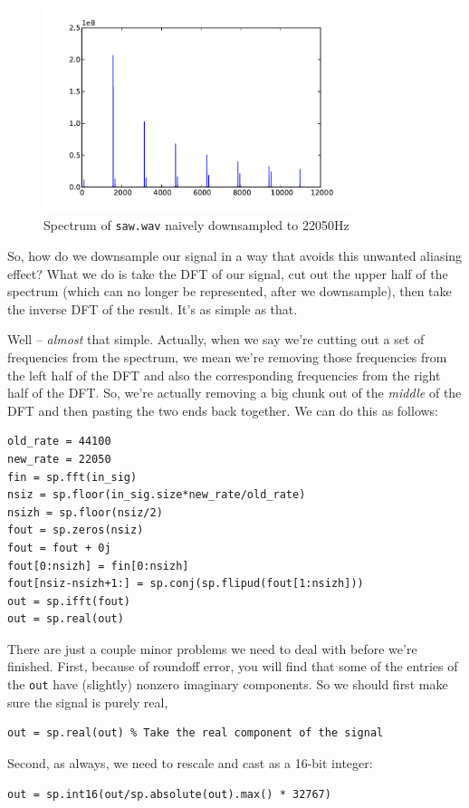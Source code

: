 \begin{figure}[ht]\caption{Spectrum of \texttt{saw.wav} naively downsampled to 22050Hz}\label{sawspecdown}\centering\includegraphics[width=90mm]{sawspecdown}\end{figure}

So, how do we downsample our signal in a way that avoids this unwanted aliasing effect? What we do is take the DFT of our signal, cut out the upper half of the spectrum (which can no longer be represented, after we downsample), then take the inverse DFT of the result. It's as simple as that.

Well -- \emph{almost} that simple. Actually, when we say we're cutting out a set of frequencies from the spectrum, we mean we're removing those frequencies from the left half of the DFT and also the corresponding frequencies from the right half of the DFT. So, we're actually removing a big chunk out of the \emph{middle} of the DFT and then pasting the two ends back together. We can do this as follows:
\begin{lstlisting}
old_rate = 44100
new_rate = 22050
fin = sp.fft(in_sig)
nsiz = sp.floor(in_sig.size*new_rate/old_rate)
nsizh = sp.floor(nsiz/2)
fout = sp.zeros(nsiz)
fout = fout + 0j
fout[0:nsizh] = fin[0:nsizh]
fout[nsiz-nsizh+1:] = sp.conj(sp.flipud(fout[1:nsizh]))
out = sp.ifft(fout)
out = sp.real(out)
\end{lstlisting}
There are just a couple minor problems we need to deal with before we're finished. First, because of roundoff error, you will find that some of the entries of the \texttt{out} have (slightly) nonzero imaginary components.  So we should first make sure the signal is purely real,
\begin{lstlisting}
out = sp.real(out) % Take the real component of the signal
\end{lstlisting}
Second, as always, we need to rescale and cast as a 16-bit integer:
\begin{lstlisting}
out = sp.int16(out/sp.absolute(out).max() * 32767)
\end{lstlisting}


